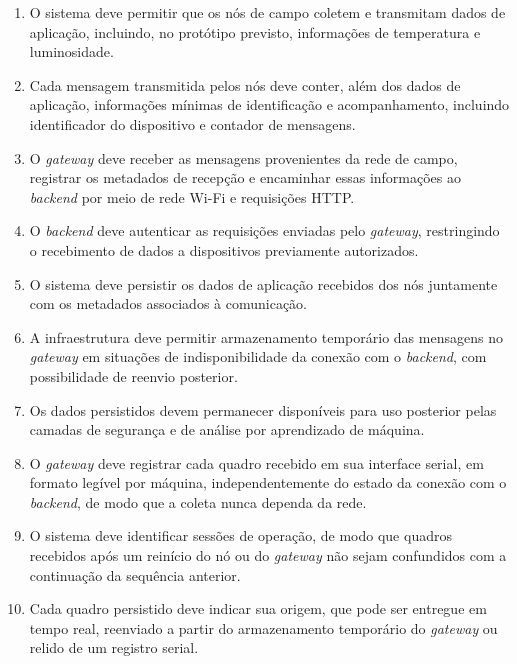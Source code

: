\begin{enumerate}
    \item[RF-I1.] O sistema deve permitir que os nós de campo coletem e transmitam dados de aplicação, incluindo, no protótipo previsto, informações de temperatura e luminosidade.

    \item[RF-I2.] Cada mensagem transmitida pelos nós deve conter, além dos dados de aplicação, informações mínimas de identificação e acompanhamento, incluindo identificador do dispositivo e contador de mensagens.

    \item[RF-I3.] O \textit{gateway} deve receber as mensagens provenientes da rede de campo, registrar os metadados de recepção e encaminhar essas informações ao \textit{backend} por meio de rede Wi-Fi e requisições HTTP.

    \item[RF-I4.] O \textit{backend} deve autenticar as requisições enviadas pelo \textit{gateway}, restringindo o recebimento de dados a dispositivos previamente autorizados.

    \item[RF-I5.] O sistema deve persistir os dados de aplicação recebidos dos nós juntamente com os metadados associados à comunicação.

    \item[RF-I6.] A infraestrutura deve permitir armazenamento temporário das mensagens no \textit{gateway} em situações de indisponibilidade da conexão com o \textit{backend}, com possibilidade de reenvio posterior.

    \item[RF-I7.] Os dados persistidos devem permanecer disponíveis para uso posterior pelas camadas de segurança e de análise por aprendizado de máquina.

    \item[RF-I8.] O \textit{gateway} deve registrar cada quadro recebido em sua interface serial, em formato legível por máquina, independentemente do estado da conexão com o \textit{backend}, de modo que a coleta nunca dependa da rede.

    \item[RF-I9.] O sistema deve identificar sessões de operação, de modo que quadros recebidos após um reinício do nó ou do \textit{gateway} não sejam confundidos com a continuação da sequência anterior.

    \item[RF-I10.] Cada quadro persistido deve indicar sua origem, que pode ser entregue em tempo real, reenviado a partir do armazenamento temporário do \textit{gateway} ou relido de um registro serial.


\end{enumerate}
